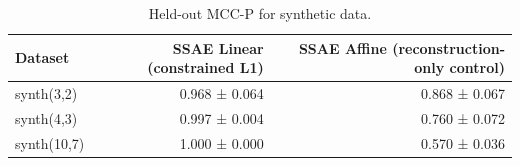 \begin{table}[t]
\centering
\caption{Held-out MCC-P for synthetic data.}
\label{tab:synthetic-mcc-p}
\begin{tabular}{lrr}
\toprule
Dataset & SSAE Linear (constrained L1) & SSAE Affine (reconstruction-only control) \\
\midrule
synth(3,2) & 0.968 ± 0.064 & 0.868 ± 0.067 \\
synth(4,3) & 0.997 ± 0.004 & 0.760 ± 0.072 \\
synth(10,7) & 1.000 ± 0.000 & 0.570 ± 0.036 \\
\bottomrule
\end{tabular}
\end{table}
